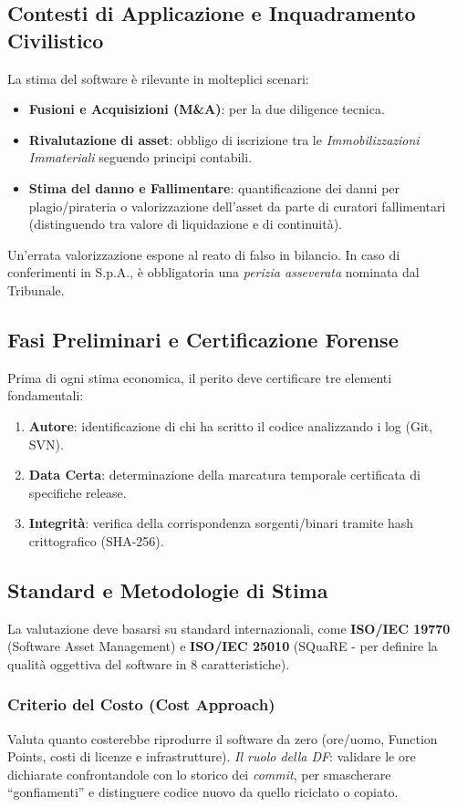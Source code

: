 \documentclass[11pt,a4paper]{article}
\begin{document}
\subsection{Contesti di Applicazione e Inquadramento Civilistico}
La stima del software è rilevante in molteplici scenari:
\begin{itemize}
    \item \textbf{Fusioni e Acquisizioni (M\&A)}: per la due diligence tecnica.
    \item \textbf{Rivalutazione di asset}: obbligo di iscrizione tra le \textit{Immobilizzazioni Immateriali} seguendo principi contabili.
    \item \textbf{Stima del danno e Fallimentare}: quantificazione dei danni per plagio/pirateria o valorizzazione dell'asset da parte di curatori fallimentari (distinguendo tra valore di liquidazione e di continuità).
\end{itemize}

Un'errata valorizzazione espone al reato di falso in bilancio. In caso di conferimenti in S.p.A., è obbligatoria una \textit{perizia asseverata} nominata dal Tribunale.

\subsection{Fasi Preliminari e Certificazione Forense}
Prima di ogni stima economica, il perito deve certificare tre elementi fondamentali:
\begin{enumerate}
    \item \textbf{Autore}: identificazione di chi ha scritto il codice analizzando i log (Git, SVN).
    \item \textbf{Data Certa}: determinazione della marcatura temporale certificata di specifiche release.
    \item \textbf{Integrità}: verifica della corrispondenza sorgenti/binari tramite hash crittografico (SHA-256).
\end{enumerate}

\subsection{Standard e Metodologie di Stima}
La valutazione deve basarsi su standard internazionali, come \textbf{ISO/IEC 19770} (Software Asset Management) e \textbf{ISO/IEC 25010} (SQuaRE - per definire la qualità oggettiva del software in 8 caratteristiche).

\subsubsection{Criterio del Costo (Cost Approach)}
Valuta quanto costerebbe riprodurre il software da zero (ore/uomo, Function Points, costi di licenze e infrastrutture). 
\textit{Il ruolo della DF}: validare le ore dichiarate confrontandole con lo storico dei \textit{commit}, per smascherare ``gonfiamenti'' e distinguere codice nuovo da quello riciclato o copiato.
\end{document}
